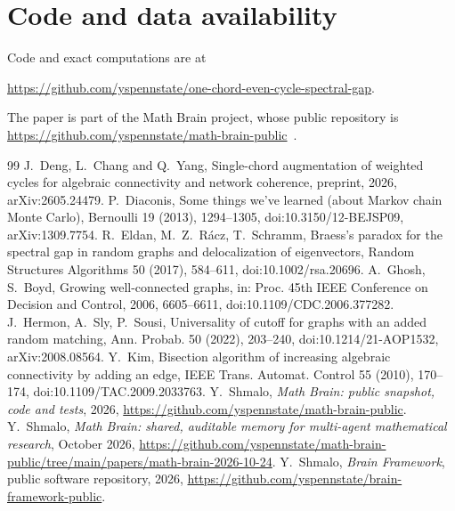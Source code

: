 \documentclass[11pt]{amsart}
\theoremstyle{remark}
\begin{document}
\section*{Code and data availability}
Code and exact computations are at

\url{https://github.com/yspennstate/one-chord-even-cycle-spectral-gap}.

The paper is part of the Math Brain project, whose public repository is
\url{https://github.com/yspennstate/math-brain-public}~\cite{MathBrainRepo}.

\begin{thebibliography}{99}
 J.~Deng, L.~Chang and Q.~Yang, Single-chord augmentation of weighted cycles for algebraic connectivity
and network coherence, preprint, 2026, arXiv:2605.24479.
P.~Diaconis, Some things we've learned (about Markov chain Monte Carlo), Bernoulli 19 (2013),
1294--1305, doi:10.3150/12-BEJSP09, arXiv:1309.7754.
 R.~Eldan, M.~Z.~R\'acz, T.~Schramm, Braess's paradox for the spectral gap in random graphs and
delocalization of eigenvectors, Random Structures Algorithms 50 (2017), 584--611, doi:10.1002/rsa.20696.
 A.~Ghosh, S.~Boyd, Growing well-connected graphs, in: Proc. 45th IEEE Conference on Decision and
Control, 2006, 6605--6611, doi:10.1109/CDC.2006.377282.
 J.~Hermon, A.~Sly, P.~Sousi, Universality of cutoff for graphs with an added random matching, Ann.
Probab. 50 (2022), 203--240, doi:10.1214/21-AOP1532, arXiv:2008.08564.
 Y.~Kim, Bisection algorithm of increasing algebraic connectivity by adding an edge, IEEE Trans.
Automat. Control 55 (2010), 170--174, doi:10.1109/TAC.2009.2033763.
 Y.~Shmalo, \emph{Math Brain: public snapshot, code and tests}, 2026,
\url{https://github.com/yspennstate/math-brain-public}.
 Y.~Shmalo, \emph{Math Brain: shared, auditable memory for multi-agent mathematical research},
October 2026, \url{https://github.com/yspennstate/math-brain-public/tree/main/papers/math-brain-2026-10-24}.
 Y.~Shmalo, \emph{Brain Framework}, public software repository, 2026,
\url{https://github.com/yspennstate/brain-framework-public}.
\end{thebibliography}
\end{document}
